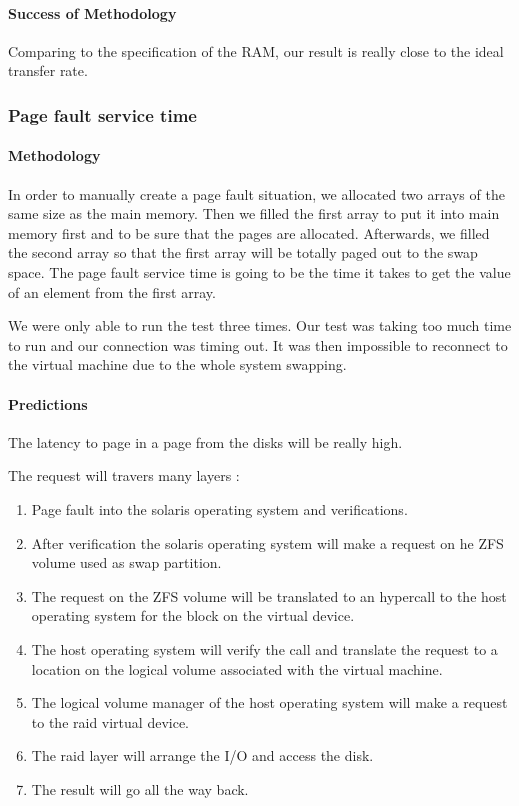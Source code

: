\paragraph{Success of Methodology}
Comparing to the specification of the RAM, our result is really close to the
ideal transfer rate.


\subsubsection{Page fault service time}
\paragraph{Methodology}
In order to manually create a page fault situation, we allocated two arrays of
the same size as the main memory.
Then we filled the first array to put it into main memory first and to be sure that the pages are allocated.
Afterwards, we filled the second array so that the first array will be totally paged out to the swap space.
The page fault service time is going to be the time it takes to get the value of an element from the first array.

We were only able to run the test three times.
Our test was taking too much time to run and our connection was timing out.
It was then impossible to reconnect to the virtual machine due to the whole
system swapping.

\paragraph{Predictions}
The latency to page in a page from the disks will be really high.

The request will travers many layers :
\begin{enumerate}
\item Page fault into the solaris operating system and verifications.
\item After verification the solaris operating system will make a request on
he ZFS volume used as swap partition.
\item The request on the ZFS volume will be translated to an hypercall to the
host operating system for the block on the virtual device.
\item The host operating system will verify the call and translate the request
to a location on the logical volume associated with the virtual machine.
\item The logical volume manager of the host operating system will make a
request to the raid virtual device.
\item The raid layer will arrange the I/O and access the disk.
\item The result will go all the way back.
\end{enumerate}

